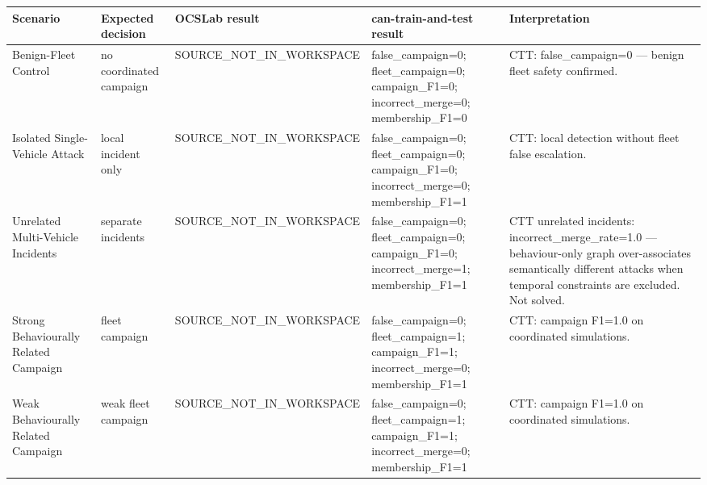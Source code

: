\begin{tabular}{lllll}
\toprule
Scenario & Expected decision & OCSLab result & can-train-and-test result & Interpretation \\
\midrule
Benign-Fleet Control & no coordinated campaign & SOURCE_NOT_IN_WORKSPACE & false_campaign=0; fleet_campaign=0; campaign_F1=0; incorrect_merge=0; membership_F1=0 & CTT: false_campaign=0 — benign fleet safety confirmed. \\
Isolated Single-Vehicle Attack & local incident only & SOURCE_NOT_IN_WORKSPACE & false_campaign=0; fleet_campaign=0; campaign_F1=0; incorrect_merge=0; membership_F1=1 & CTT: local detection without fleet false escalation. \\
Unrelated Multi-Vehicle Incidents & separate incidents & SOURCE_NOT_IN_WORKSPACE & false_campaign=0; fleet_campaign=0; campaign_F1=0; incorrect_merge=1; membership_F1=1 & CTT unrelated incidents: incorrect_merge_rate=1.0 — behaviour-only graph over-associates semantically different attacks when temporal constraints are excluded. Not solved. \\
Strong Behaviourally Related Campaign & fleet campaign & SOURCE_NOT_IN_WORKSPACE & false_campaign=0; fleet_campaign=1; campaign_F1=1; incorrect_merge=0; membership_F1=1 & CTT: campaign F1=1.0 on coordinated simulations. \\
Weak Behaviourally Related Campaign & weak fleet campaign & SOURCE_NOT_IN_WORKSPACE & false_campaign=0; fleet_campaign=1; campaign_F1=1; incorrect_merge=0; membership_F1=1 & CTT: campaign F1=1.0 on coordinated simulations. \\
\bottomrule
\end{tabular}
